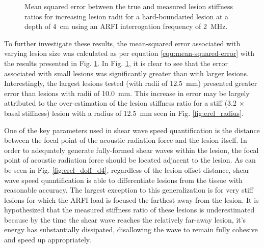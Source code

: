 			\begin{figure}[!htb]
				\centering
				\caption[Shear-wave speed quantified squared error related to lesion radius]{Mean squared error between the true and measured lesion stiffness ratios for increasing lesion radii for a hard-boundaried lesion at a depth of \SI{4}{\cm} using an ARFI interrogation frequency of \SI{2}{\MHz}.}
				\label{fig:erel_radius_mse}
			\end{figure}

			To further investigate these results, the mean-squared error associated with varying lesion size was calculated as per equation \ref{equ:mean-squared-error} with the results presented in Fig. \ref{fig:erel_radius_mse}. In Fig. \ref{fig:erel_radius_mse}, it is clear to see that the error associated with small lesions was significantly greater than with larger lesions. Interestingly, the largest lesions tested (with radii of \SI{12.5}{\mm}) presented greater error than lesions with radii of \SI{10.0}{\mm}. This increase in error may be largely attributed to the over-estimation of the lesion stiffness ratio for a stiff (3.2 $\times$ basal stiffness) lesion with a radius of \SI{12.5}{\mm} seen in Fig. \ref{fig:erel_radius}.

			One of the key parameters used in shear wave speed quantification is the distance between the focal point of the acoustic radiation force and the lesion itself. In order to adequately generate fully-formed shear waves within the lesion, the focal point of acoustic radiation force should be located adjacent to the lesion. As can be seen in Fig. \ref{fig:erel_doff_d4}, regardless of the lesion offset distance, shear wave speed quantification is able to differentiate lesions from the tissue with reasonable accuracy. The largest exception to this generalization is for very stiff lesions for which the ARFI load is focused the farthest away from the lesion. It is hypothesized that the measured stiffness ratio of these lesions is underestimated because by the time the shear wave reaches the relatively far-away lesion, it's energy has substantially dissipated, disallowing the wave to remain fully cohesive and speed up appropriately.

